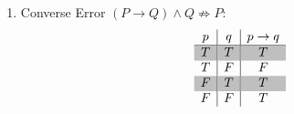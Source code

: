 \begin{enumerate}
\begin{multicols}{2}
\begin{enumerate}
	\item[(a)] Negation\\[5pt]
	$\begin{array}{c|c}
		p & \sim p \\ \hline
		T & F \\
		F & T \\
	\end{array}$\vspace{20pt}
	\item[(b)] Conjunction\\[5pt]
	$\begin{array}{c|c|c}
		p & q & p\land q \\ \hline
		T & T & T\\
		T & F & F\\
		F & T & F\\
		F & F & F\\
	\end{array}$
\columnbreak
        \item[(c)] Disjunction\\[5pt]
	$\begin{array}{c|c|c}
		p & q & p\lor q \\ \hline
		T & T & T\\
		T & F & T\\
		F & T & T\\
		F & F & F\\
	\end{array}$
	\item[(d)] Conditional\\[5pt]
	$\begin{array}{c|c|c}
		p & q & p\rightarrow q \\ \hline
		T & T & T\\
		T & F & F\\
		F & T & T\\
		F & F & T\\
	\end{array}$
\end{enumerate}
\end{multicols}

\noindent
	\item Converse Error \((P\rightarrow Q) \wedge Q \not\Rightarrow P\):
\[ 
	\begin{array}{c|c|c}
			p & q & p\rightarrow q \\ \hline 
			\rowcolor{gray!50!white} T & T & T\\ 
			T & F & F\\
			\rowcolor{gray!50!white} F & T & T\\
			F & F & T\\
	\end{array}
\]


\end{enumerate}
